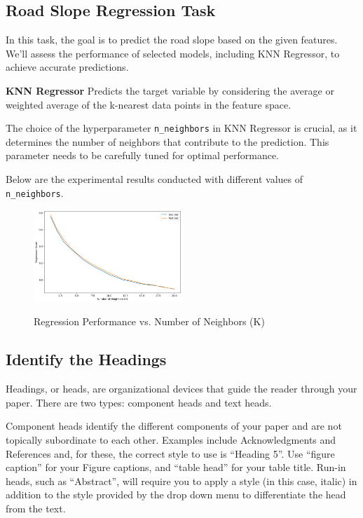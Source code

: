 \documentclass[conference]{IEEEtran}
\begin{document}
\subsection{Road Slope Regression Task}
In this task, the goal is to predict the road slope based on the given features. We'll assess the performance of selected models, including KNN Regressor, to achieve accurate predictions.

\noindent \textbf{KNN Regressor} \hspace{0.2em} Predicts the target variable by considering the average or weighted average of the k-nearest data points in the feature space.

The choice of the hyperparameter \texttt{n\_neighbors} in KNN Regressor is crucial, as it determines the number of neighbors that contribute to the prediction. This parameter needs to be carefully tuned for optimal performance.

Below are the experimental results conducted with different values of \texttt{n\_neighbors}.


\begin{figure}[h]
    \centering
    \includegraphics[width=0.5\textwidth]{regression_score.png}
    \label{fig:different_k_results}
    \caption{Regression Performance vs. Number of Neighbors (K)}
\end{figure}


\subsection{Identify the Headings}
Headings, or heads, are organizational devices that guide the reader through 
your paper. There are two types: component heads and text heads.

Component heads identify the different components of your paper and are not 
topically subordinate to each other. Examples include Acknowledgments and 
References and, for these, the correct style to use is ``Heading 5''. Use 
``figure caption'' for your Figure captions, and ``table head'' for your 
table title. Run-in heads, such as ``Abstract'', will require you to apply a 
style (in this case, italic) in addition to the style provided by the drop 
down menu to differentiate the head from the text.
\end{document}
